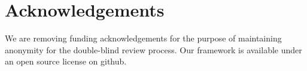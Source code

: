\section{Acknowledgements}
\label{sec:ack}

We are removing funding acknowledgements for the purpose of maintaining
anonymity for the double-blind review process.
Our framework is available under an open source license on github.


